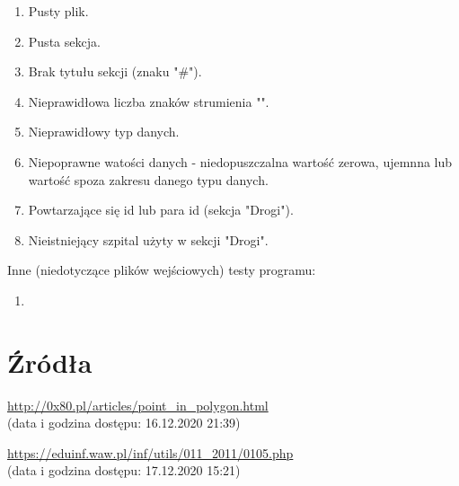\documentclass[10pt,a4paper]{article}
\begin{document}
\begin{enumerate}
    \item Pusty plik.
    \item Pusta sekcja.
    \item Brak tytułu sekcji (znaku "\#").
    \item Nieprawidłowa liczba znaków strumienia "\textbar".
    \item Nieprawidłowy typ danych.
    \item Niepoprawne watości danych - niedopuszczalna wartość zerowa, ujemnna lub wartość spoza zakresu danego typu danych.
    \item Powtarzające się id lub para id (sekcja "Drogi").
    \item Nieistniejący szpital użyty w sekcji "Drogi".
\end{enumerate}

Inne (niedotyczące plików wejściowych) testy programu:
\begin{enumerate}
    \item
\end{enumerate}


\section{Źródła}

\begin{enumerate}[{[1]}]
    \item \url{http://0x80.pl/articles/point_in_polygon.html} \\(data i godzina dostępu: 16.12.2020 21:39)
    \item \url{https://eduinf.waw.pl/inf/utils/011_2011/0105.php} \\(data i godzina dostępu: 17.12.2020 15:21)
\end{enumerate}
\end{document}
